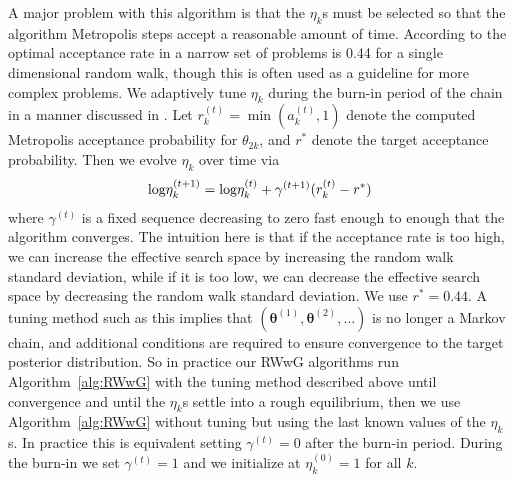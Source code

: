 \documentclass[12pt]{article}
\def\log{\hbox{log}}
\begin{document}
A major problem with this algorithm is that the $\eta_k$s must be selected so that the algorithm Metropolis steps accept a reasonable amount of time. According to \citet{gelman1996efficient} the optimal acceptance rate in a narrow set of problems is 0.44 for a single dimensional random walk, though this is often used as a guideline for more complex problems. We adaptively tune $\eta_k$ during the burn-in period of the chain in a manner discussed in \citet{andrieu2008tutorial}. Let $r_{k}^{(t)} = \min(a_k^{(t)}, 1)$ denote the computed Metropolis acceptance probability for $\theta_{2k}$, and $r^*$ denote the target acceptance probability. Then we evolve $\eta_k$ over time via
\begin{align*}
\log\eta_{k}^{(t+1)} = \log\eta_{k}^{(t)} + \gamma^{(t+1)}(r_k^{(t)} - r^*)
\end{align*}
where $\gamma^{(t)}$ is a fixed sequence decreasing to zero fast enough to enough that the algorithm converges. The intuition here is that if the acceptance rate is too high, we can increase the effective search space by increasing the random walk standard deviation, while if it is too low, we can decrease the effective search space by decreasing the random walk standard deviation. We use $r^*=0.44$. A tuning method such as this implies that $(\bm{\theta}^{(1)}, \bm{\theta}^{(2)},\dots)$ is no longer a Markov chain, and additional conditions are required to ensure convergence to the target posterior distribution. So in practice our RWwG algorithms run Algorithm~\ref{alg:RWwG} with the tuning method described above until convergence and until the $\eta_k$s settle into a rough equilibrium, then we use Algorithm~\ref{alg:RWwG} without tuning but using the last known values of the $\eta_k$s. In practice this is equivalent setting $\gamma^{(t)}=0$ after the burn-in period. During the burn-in we set $\gamma^{(t)}=1$ and we initialize at $\eta_k^{(0)}=1$ for all $k$.
\end{document}
